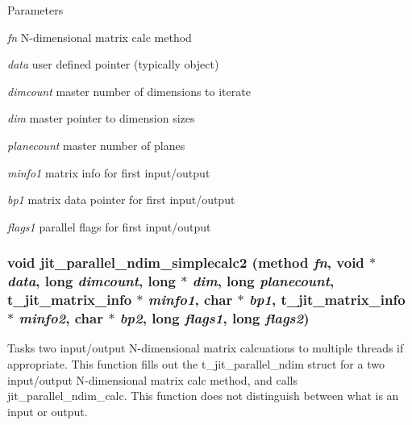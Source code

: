 \begin{DoxyParams}{Parameters}
\item[{\em fn}]N-\/dimensional matrix calc method \item[{\em data}]user defined pointer (typically object) \item[{\em dimcount}]master number of dimensions to iterate \item[{\em dim}]master pointer to dimension sizes \item[{\em planecount}]master number of planes \item[{\em minfo1}]matrix info for first input/output \item[{\em bp1}]matrix data pointer for first input/output \item[{\em flags1}]parallel flags for first input/output \end{DoxyParams}
\hypertarget{group__parallelutilmod_gaeb6c9b472d61bdda9fd33aa61a36df1f}{
\subsubsection[{jit\_\-parallel\_\-ndim\_\-simplecalc2}]{\setlength{\rightskip}{0pt plus 5cm}void jit\_\-parallel\_\-ndim\_\-simplecalc2 ({\bf method} {\em fn}, \/  void $\ast$ {\em data}, \/  long {\em dimcount}, \/  long $\ast$ {\em dim}, \/  long {\em planecount}, \/  {\bf t\_\-jit\_\-matrix\_\-info} $\ast$ {\em minfo1}, \/  char $\ast$ {\em bp1}, \/  {\bf t\_\-jit\_\-matrix\_\-info} $\ast$ {\em minfo2}, \/  char $\ast$ {\em bp2}, \/  long {\em flags1}, \/  long {\em flags2})}}
\label{group__parallelutilmod_gaeb6c9b472d61bdda9fd33aa61a36df1f}


Tasks two input/output N-\/dimensional matrix calcuations to multiple threads if appropriate. This function fills out the t\_\-jit\_\-parallel\_\-ndim struct for a two input/output N-\/dimensional matrix calc method, and calls jit\_\-parallel\_\-ndim\_\-calc. This function does not distinguish between what is an input or output.


